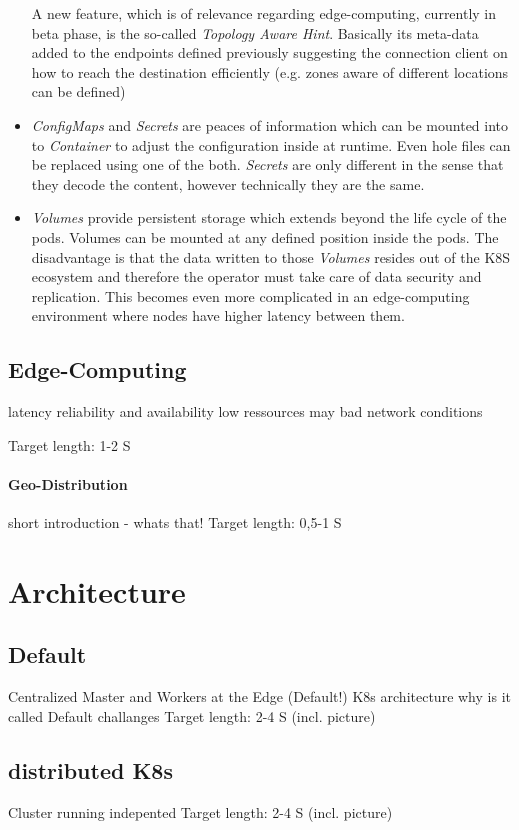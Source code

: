 \documentclass[MSC,Master,english]{twbook}%
\begin{document}
\begin{itemize}
    A new feature, which is of relevance regarding edge-computing, currently in beta phase, is the so-called \textit{Topology Aware Hint}. Basically its meta-data added to the endpoints defined previously suggesting the connection client on how to reach the destination efficiently (e.g. zones aware of different locations can be defined)
    \item \textit{ConfigMaps} and \textit{Secrets} are peaces of information which can be mounted into to \textit{Container} to adjust the configuration inside at runtime. Even hole files can be replaced using one of the both. \textit{Secrets} are only different in the sense that they decode the content, however technically they are the same.
    \item \textit{Volumes} provide persistent storage which extends beyond the life cycle of the pods. Volumes can be mounted at any defined position inside the pods. The disadvantage is that the data written to those \textit{Volumes} resides out of the \ac{K8S} ecosystem and therefore the operator must take care of data security and replication. This becomes even more complicated in an edge-computing environment where nodes have higher latency between them.
\end{itemize}

\subsection{Edge-Computing}
latency
reliability and availability
low ressources
may bad network conditions

Target length: 1-2 S
\paragraph{Geo-Distribution}
short introduction - whats that!
Target length: 0,5-1 S




\section{Architecture}
\label{sec:architecture}
\subsection{Default}
Centralized Master and Workers at the Edge (Default!) K8s architecture
why is it called Default
challanges
Target length: 2-4 S (incl. picture)
\subsection{distributed K8s}
Cluster running indepented
Target length: 2-4 S (incl. picture)
\end{document}

